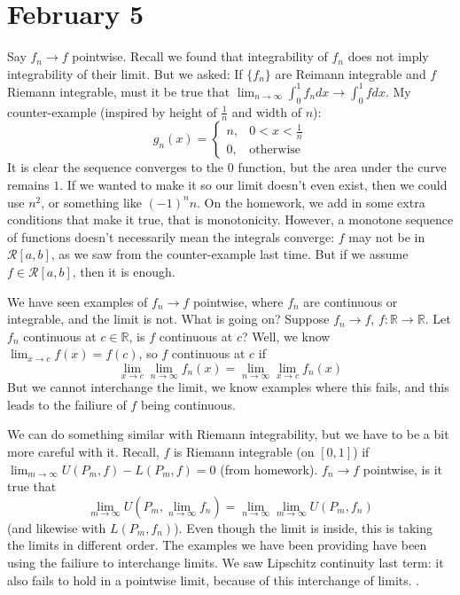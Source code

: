 \documentclass{article}
\theoremstyle{plain}
\theoremstyle{remark}
\newcommand{\R}{{\mathbb R}}
\begin{document}
\section{February 5}
Say $f_n \to f$ pointwise.
Recall we found that integrability of $f_n$ does not imply integrability of their limit.
But we asked: If $\{f_n\}$ are Reimann integrable and $f$ Riemann integrable,
must it be true that $\lim_{n\to\infty} \int_0^1 f_ndx \to \int_0^1 fdx$.
My counter-example (inspired by height of $\frac{1}{n}$ and width of $n$):
\[
	g_n(x) = \begin{cases}
		n, & 0 < x < \frac{1}{n}\\
		0, &\text{otherwise}
	\end{cases}
\]
It is clear the sequence converges to the $0$ function,
but the area under the curve remains $1$.
If we wanted to make it so our limit doesn't even exist,
then we could use $n^2$, or something like $(-1)^nn$.
On the homework, we add in some extra conditions that make it true,
that is monotonicity.
However, a monotone sequence of functions doesn't necessarily mean
the integrals converge: $f$ may not be in $\mathcal{R}[a,b]$,
as we saw from the counter-example last time.
But if we assume $f \in \mathcal{R}[a,b]$, then it is enough.

We have seen examples of $f_n \to f$ pointwise,
where $f_n$ are continuous or integrable, and the limit is not.
What is going on?
Suppose $f_n \to f$, $f \colon \R \to \R$.
Let $f_n$ continuous at $c \in \R$, is $f$ continuous at $c$?
Well, we know $\lim_{x \to c}f(x) = f(c)$, so $f$ continuous at $c$ if
\[
	\lim_{x \to c} \lim_{n \to \infty} f_n(x) = \lim_{n\to\infty} \lim_{x \to c} f_n(x)
\]
But we cannot interchange the limit, we know examples where this fails,
and this leads to the failiure of $f$ being continuous.

We can do something similar with Riemann integrability,
but we have to be a bit more careful with it.
Recall, $f$ is Riemann integrable (on $[0,1]$) if
$\lim_{m\to\infty} U(P_m,f) - L(P_m,f) = 0$ (from homework).
$f_n \to f$ pointwise, is it true that
\[
	\lim_{m\to\infty} U(P_m, \lim_{n\to\infty} f_n)
	= \lim_{n\to\infty} \lim_{m\to\infty} U(P_m,f_n)
\]
(and likewise with $L(P_m,f_n)$).
Even though the limit is inside, this is taking the limits in different order.
The examples we have been providing have been using the failiure to
interchange limits.
We saw Lipschitz continuity last term: it also fails to hold in
a pointwise limit, because of this interchange of limits.
.
\end{document}
